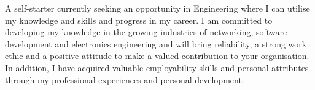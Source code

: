 

\begin{cvparagraph}

A self-starter currently seeking an opportunity in Engineering where I can utilise my knowledge and skills and progress in my career. I am committed to developing my knowledge in the growing industries of networking, software development and electronics engineering and will bring reliability, a strong work ethic and a positive attitude to make a valued contribution to your organisation. In addition, I have acquired valuable employability skills and personal attributes through my professional experiences and personal development.
\end{cvparagraph}